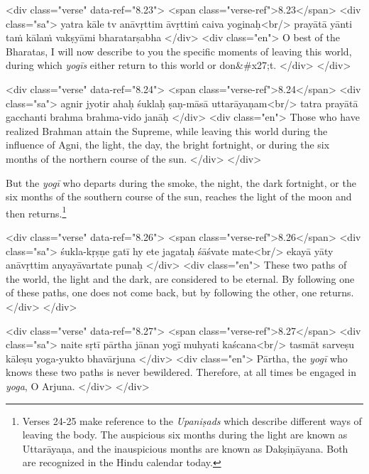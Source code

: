 \begin{html}
<div class="verse" data-ref="8.23">
  <span class="verse-ref">8.23</span>
  <div class="sa">
    yatra kāle tv anāvṛttim āvṛttiṁ caiva yoginaḥ<br/>
    prayātā yānti taṁ kālaṁ vakṣyāmi bharatarṣabha
  </div>
  <div class="en">
    O best of the Bharatas, I will now describe to you the specific moments of leaving this world, during which \textit{yogīs} either return to this world or don&#x27;t.
  </div>
</div>
\end{html}



\begin{html}
<div class="verse" data-ref="8.24">
  <span class="verse-ref">8.24</span>
  <div class="sa">
    agnir jyotir ahaḥ śuklaḥ ṣaṇ-māsā uttarāyaṇam<br/>
    tatra prayātā gacchanti brahma brahma-vido janāḥ
  </div>
  <div class="en">
    Those who have realized Brahman attain the Supreme, while leaving this world during the influence of Agni, the light, the day, the bright fortnight, or during the six months of the northern course of the sun.
  </div>
</div>
\end{html}


{But the \textit{yogī} who departs during the smoke, the night, the dark fortnight, or the six months of the southern course of the sun, reaches the light of the moon and then returns.\footnote{Verses 24-25 make reference to the \textit{Upaniṣads} which describe different ways of leaving the body. The auspicious six months during the light are known as Uttarāyaṇa, and the inauspicious months are known as Dakṣiṇāyana. Both are recognized in the Hindu calendar today.}}


\begin{html}
<div class="verse" data-ref="8.26">
  <span class="verse-ref">8.26</span>
  <div class="sa">
    śukla-kṛṣṇe gatī hy ete jagataḥ śāśvate mate<br/>
    ekayā yāty anāvṛttim anyayāvartate punaḥ
  </div>
  <div class="en">
    These two paths of the world, the light and the dark, are considered to be eternal. By following one of these paths, one does not come back, but by following the other, one returns.
  </div>
</div>
\end{html}



\begin{html}
<div class="verse" data-ref="8.27">
  <span class="verse-ref">8.27</span>
  <div class="sa">
    naite sṛtī pārtha jānan yogī muhyati kaścana<br/>
    tasmāt sarveṣu kāleṣu yoga-yukto bhavārjuna
  </div>
  <div class="en">
    Pārtha, the \textit{yogī} who knows these two paths is never bewildered. Therefore, at all times be engaged in \textit{yoga}, O Arjuna.
  </div>
</div>
\end{html}



